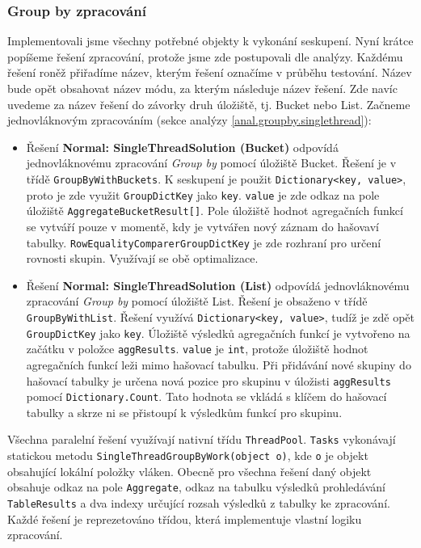 \subsubsection{Group by zpracování}

Implementovali jsme všechny potřebné objekty k vykonání seskupení.
Nyní krátce popíšeme řešení zpracování, protože jsme zde postupovali dle analýzy.
Každému řešení roněž přiřadíme název, kterým řešení označíme v průběhu testování.
Název bude opět obsahovat název módu, za kterým následuje název řešení.
Zde navíc uvedeme za název řešení do závorky druh úložiště, tj. Bucket nebo List.
Začneme jednovláknovým zpracováním (sekce analýzy \ref{anal.groupby.singlethread}):
\begin{itemize}

\item Řešení \textbf{Normal: SingleThreadSolution (Bucket)} odpovídá jednovláknovému zpracování \textit{Group by} pomocí úložiště Bucket.
Řešení je v třídě \texttt{GroupByWithBuckets}.
K seskupení je použit \texttt{Dictionary<key, value>}, proto je zde využit \texttt{GroupDictKey} jako \texttt{key}.
\texttt{value} je zde odkaz na pole úložiště \texttt{AggregateBucketResult[]}.
Pole úložiště hodnot agregačních funkcí se vytváří pouze v momentě, kdy je vytvářen nový záznam do hašovaví tabulky.
\texttt{RowEqualityComparerGroupDictKey} je zde rozhraní pro určení rovnosti skupin.
Využívají se obě optimalizace.

\item  Řešení \textbf{Normal: SingleThreadSolution (List)} odpovídá jednovláknovému zpracování \textit{Group by} pomocí úložiště List.
Řešení je obsaženo v třídě \texttt{GroupByWithList}.
Řešení využívá \texttt{Dictionary<key, value>}, tudíž je zdě opět \texttt{GroupDictKey} jako \texttt{key}.
Úložiště výsledků agregačních funkcí je vytvořeno na začátku v položce \texttt{aggResults}.
\texttt{value} je \texttt{int}, protože úložiště hodnot agregačních funkcí leži mimo hašovací tabulku.
Při přidávání nové skupiny do hašovací tabulky je určena nová pozice pro skupinu v úložisti \texttt{aggResults} pomocí \texttt{Dictionary.Count}.
Tato hodnota se vkládá s klíčem do hašovací tabulky a skrze ni se přistoupí k výsledkům funkcí pro skupinu.
\end{itemize}
Všechna paralelní řešení využívají nativní třídu \texttt{ThreadPool}.
\texttt{Tasks} vykonávají statickou metodu \texttt{SingleThreadGroupByWork(object o)}, kde \texttt{o} je objekt obsahující lokální položky vláken.
Obecně pro všechna řešení daný objekt obsahuje odkaz na pole \texttt{Aggregate}, odkaz na tabulku výsledků prohledávání \texttt{TableResults} a dva indexy určující rozsah výsledků z tabulky ke zpracování.
Každé řešení je reprezetováno třídou, která implementuje vlastní logiku zpracování.

